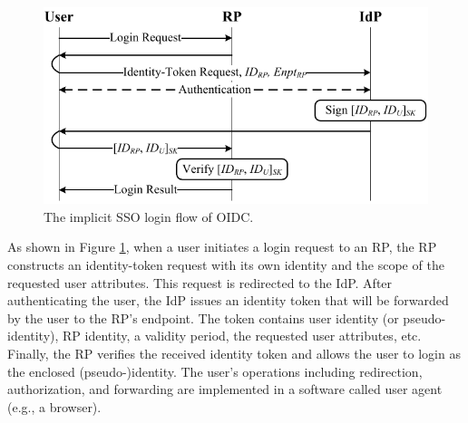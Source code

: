 \begin{figure}[t]
  \centering
  \includegraphics[width=0.9\linewidth]{fig/OIDC1.pdf}
  \caption{The implicit SSO login flow of OIDC.}
  \label{fig:OpenID}
\end{figure}

As shown in Figure \ref{fig:OpenID}, when a user initiates a login request to an RP, the RP constructs an identity-token request with its own identity and the scope of the requested user attributes.
This request is redirected to the IdP.
After authenticating the user, the IdP issues an identity token that will be forwarded by the user to the RP's endpoint.
The token contains user identity (or pseudo-identity), RP identity, a validity period, the requested user attributes, etc.
Finally, the RP verifies the received identity token and allows the user to login as the  enclosed (pseudo-)identity.
The user's operations including redirection, authorization, and forwarding are implemented in a software called user agent (e.g., a browser).




